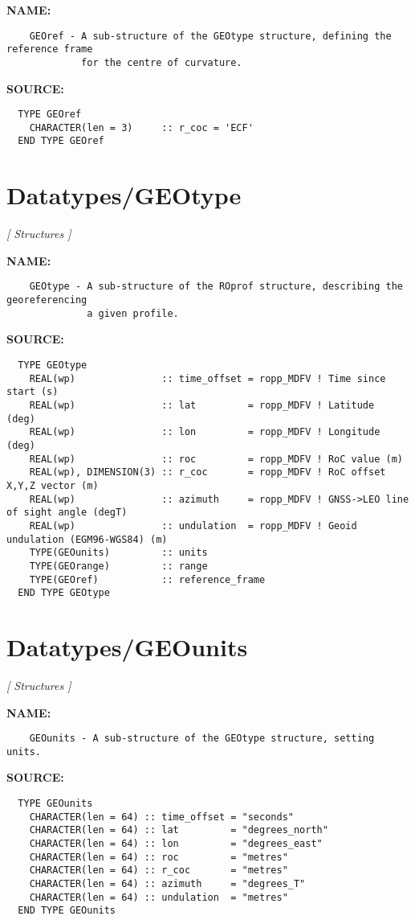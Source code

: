 \label{ch:robo26}
\label{ch:Datatypes_GEOref}
\textbf{NAME:}\hspace{0.08in}\begin{Verbatim}
    GEOref - A sub-structure of the GEOtype structure, defining the reference frame
             for the centre of curvature.
\end{Verbatim}
\textbf{SOURCE:}\hspace{0.08in}\begin{Verbatim}
  TYPE GEOref
    CHARACTER(len = 3)     :: r_coc = 'ECF'
  END TYPE GEOref
\end{Verbatim}
\section{Datatypes/GEOtype}
\textsl{[ Structures ]}

\label{ch:robo27}
\label{ch:Datatypes_GEOtype}
\textbf{NAME:}\hspace{0.08in}\begin{Verbatim}
    GEOtype - A sub-structure of the ROprof structure, describing the georeferencing
              a given profile.
\end{Verbatim}
\textbf{SOURCE:}\hspace{0.08in}\begin{Verbatim}
  TYPE GEOtype
    REAL(wp)               :: time_offset = ropp_MDFV ! Time since start (s)
    REAL(wp)               :: lat         = ropp_MDFV ! Latitude  (deg)
    REAL(wp)               :: lon         = ropp_MDFV ! Longitude (deg)
    REAL(wp)               :: roc         = ropp_MDFV ! RoC value (m)
    REAL(wp), DIMENSION(3) :: r_coc       = ropp_MDFV ! RoC offset X,Y,Z vector (m)
    REAL(wp)               :: azimuth     = ropp_MDFV ! GNSS->LEO line of sight angle (degT)
    REAL(wp)               :: undulation  = ropp_MDFV ! Geoid undulation (EGM96-WGS84) (m)
    TYPE(GEOunits)         :: units
    TYPE(GEOrange)         :: range
    TYPE(GEOref)           :: reference_frame
  END TYPE GEOtype
\end{Verbatim}
\section{Datatypes/GEOunits}
\textsl{[ Structures ]}

\label{ch:robo28}
\label{ch:Datatypes_GEOunits}
\textbf{NAME:}\hspace{0.08in}\begin{Verbatim}
    GEOunits - A sub-structure of the GEOtype structure, setting units.
\end{Verbatim}
\textbf{SOURCE:}\hspace{0.08in}\begin{Verbatim}
  TYPE GEOunits
    CHARACTER(len = 64) :: time_offset = "seconds"
    CHARACTER(len = 64) :: lat         = "degrees_north"
    CHARACTER(len = 64) :: lon         = "degrees_east"
    CHARACTER(len = 64) :: roc         = "metres"
    CHARACTER(len = 64) :: r_coc       = "metres"
    CHARACTER(len = 64) :: azimuth     = "degrees_T"
    CHARACTER(len = 64) :: undulation  = "metres"
  END TYPE GEOunits
\end{Verbatim}
